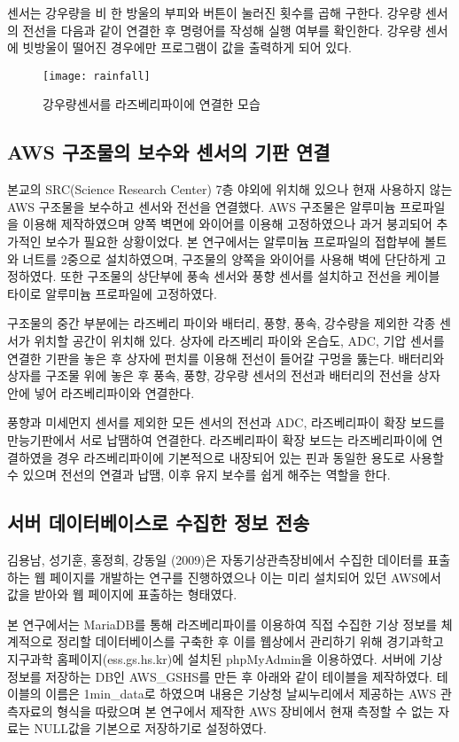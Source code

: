 센서는 강우량을 비 한 방울의 부피와 버튼이 눌러진 횟수를 곱해 구한다. 강우량 센서의 전선을 다음과 같이 연결한 후 명령어를 작성해 실행 여부를 확인한다. 강우량 센서에 빗방울이 떨어진 경우에만 프로그램이 값을 출력하게 되어 있다.

\begin{figure}[htbp]
	\centering
	\texttt{[image: rainfall]}
	\caption{강우량센서를 라즈베리파이에 연결한 모습}
	\label{RAINFALL}
\end{figure}

\subsection{AWS 구조물의 보수와 센서의 기판 연결}
본교의 SRC(Science Research Center) 7층 야외에 위치해 있으나 현재 사용하지 않는 AWS 구조물을 보수하고 센서와 전선을 연결했다. AWS 구조물은 알루미늄 프로파일을 이용해 제작하였으며 양쪽 벽면에 와이어를 이용해 고정하였으나 과거 붕괴되어 추가적인 보수가 필요한 상황이었다. 본 연구에서는 알루미늄 프로파일의 접합부에 볼트와 너트를 2중으로 설치하였으며, 구조물의 양쪽을 와이어를 사용해 벽에 단단하게 고정하였다. 또한 구조물의 상단부에 풍속 센서와 풍향 센서를 설치하고 전선을 케이블 타이로 알루미늄 프로파일에 고정하였다. 

구조물의 중간 부분에는 라즈베리 파이와 배터리, 풍향, 풍속, 강수량을 제외한 각종 센서가 위치할 공간이 위치해 있다. 상자에 라즈베리 파이와 온습도, ADC, 기압 센서를 연결한 기판을 놓은 후 상자에 펀치를 이용해 전선이 들어갈 구멍을 뚫는다. 배터리와 상자를 구조물 위에 놓은 후 풍속, 풍향, 강우량 센서의 전선과 배터리의 전선을 상자 안에 넣어 라즈베리파이와 연결한다.

풍향과 미세먼지 센서를 제외한 모든 센서의 전선과 ADC, 라즈베리파이 확장 보드를 만능기판에서 서로 납땜하여 연결한다. 라즈베리파이 확장 보드는 라즈베리파이에 연결하였을 경우 라즈베리파이에 기본적으로 내장되어 있는 핀과 동일한 용도로 사용할 수 있으며 전선의 연결과 납땜, 이후 유지 보수를 쉽게 해주는 역할을 한다.

\subsection{서버 데이터베이스로 수집한 정보 전송}
김용남, 성기훈, 홍정희, 강동일 (2009)은 자동기상관측장비에서 수집한 데이터를 표출하는 웹 페이지를 개발하는 연구를 진행하였으나 이는 미리 설치되어 있던 AWS에서 값을 받아와 웹 페이지에 표출하는 형태였다\cite{Ref2}. 

본 연구에서는 MariaDB를 통해 라즈베리파이를 이용하여 직접 수집한 기상 정보를 체계적으로 정리할 데이터베이스를 구축한 후 이를 웹상에서 관리하기 위해 경기과학고 지구과학 홈페이지(ess.gs.hs.kr)에 설치된 phpMyAdmin을 이용하였다. 서버에 기상 정보를 저장하는 DB인 AWS\_GSHS를 만든 후 아래와 같이 테이블을 제작하였다. 테이블의 이름은 1min\_data로 하였으며 내용은 기상청 날씨누리에서 제공하는 AWS 관측자료의 형식을 따랐으며 본 연구에서 제작한 AWS 장비에서 현재 측정할 수 없는 자료는 NULL값을 기본으로 저장하기로 설정하였다.

